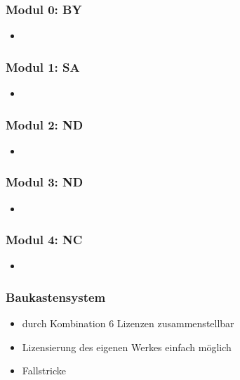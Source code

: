 \documentclass{beamer}
\begin{document}
\begin{frame}
    \frametitle{Modul 0: BY}
    \begin{itemize}
        \item 
    \end{itemize}
\end{frame}

\begin{frame}
    \frametitle{Modul 1: SA}
    \begin{itemize}
        \item 
    \end{itemize}
\end{frame}

\begin{frame}
    \frametitle{Modul 2: ND}
    \begin{itemize}
        \item 
    \end{itemize}
\end{frame}

\begin{frame}
    \frametitle{Modul 3: ND}
    \begin{itemize}
        \item 
    \end{itemize}
\end{frame}

\begin{frame}
    \frametitle{Modul 4: NC}
    \begin{itemize}
        \item 
    \end{itemize}
\end{frame}

\begin{frame}
    \frametitle{Baukastensystem}
    \begin{itemize}
        \item<2-> durch Kombination 6 Lizenzen zusammenstellbar
        \item<3-> Lizensierung des eigenen Werkes einfach möglich
        \item<4-> Fallstricke
    \end{itemize}
\end{frame}
\end{document}
